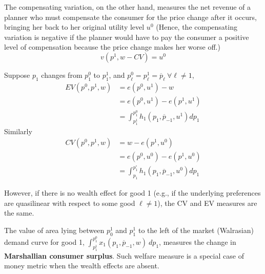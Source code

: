 \documentclass{article}
\begin{document}
 			\begin{remark}[interpretation of CV]
 				The compensating variation, on the other hand, measures the net revenue of a planner who must compensate the consumer for the price change after it occurs, bringing her back to her original utility level $u^0$ (Hence, the compensating variation is negative if the planner would have to pay the consumer a positive level of compensation because the price change makes her worse off.)
 				\begin{equation}
 					v\left(p^{1}, w-C V\right)=u^{0}
 				\end{equation}
 			\end{remark}
 			
 			\begin{proposition}
 				Suppose $p_1$ changes from $p_1^0$ to $p_1^1$, and $p^0_\ell = p^1_\ell = \overline{p}_\ell\ \forall \ell \neq 1$,
 				\begin{align}
 					EV\left(p^{0}, p^{1}, w\right) &=e\left(p^{0}, u^{1}\right)-w \\ 
 					&=e\left(p^{0}, u^{1}\right)-e\left(p^{1}, u^{1}\right) \\
 					&=\int_{p_{1}^{1}}^{p_{1}^{0}} h_{1}\left(p_{1}, \overline{p}_{-1}, u^{1}\right) d p_{1}
 				\end{align}
 				Similarly
 				\begin{align}
	 				CV\left(p^{0}, p^{1}, w\right) &= w - e(p^1, u^0) \\
	 				&= e(p^0, u^0) - e(p^1, u^0) \\
	 				&=\int_{p_{1}}^{p_{1}^{\circ}} h_{1}\left(p_{1}, \overline{p}_{-1}, u^{0}\right) d p_{1}
 				\end{align}
 			\end{proposition}
 			
 			\begin{remark}
 				However, if there is no wealth effect for good 1 (e.g., if the underlying preferences are quasilinear with respect to some good $\ell \neq 1$), the CV and EV measures are the same.
 			\end{remark}
 			
 			\begin{definition}
 				The value of area lying between $p_0^1$ and $p_1^1$ to the left of the market (Walrasian) demand curve for good 1, $\int_{p_1^1}^{p_1^0} x_1(p_1, \overline{p}_{-1}, w)\ dp_1$, measures the change in \textbf{Marshallian consumer surplus}. Such welfare measure is a special case of money metric when the wealth effects are absent.
 			\end{definition}
 			
\end{document}
